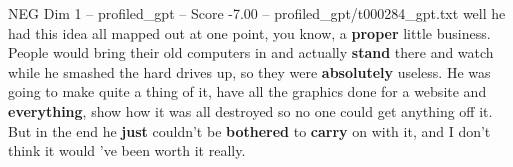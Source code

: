 \begin{textsample}{NEG Dim 1 – profiled\_gpt – Score -7.00 – profiled\_gpt/t000284\_gpt.txt}  \label{ex:f1_neg_009}
well he had this idea all mapped out at one point, you know, a \textbf{proper} little business.
People would bring their old computers in and actually \textbf{stand} there and watch while he smashed the hard drives up, so they were \textbf{absolutely} useless.
He was going to make quite a thing of it, have all the graphics done for a website and \textbf{everything}, show how it was all destroyed so no one could get anything off it.
But in the end he \textbf{just} couldn't be \textbf{bothered} to \textbf{carry} on with it, and I don't think it would ’ve been worth it really.

\end{textsample}
